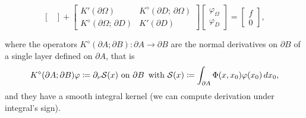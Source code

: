 \documentclass[10pt, a4paper, twoside, openright]{book}
\theoremstyle{definition}
\theoremstyle{plain}
\theoremstyle{plain}
\theoremstyle{plain}
\theoremstyle{plain}
\theoremstyle{plain}
\theoremstyle{plain}
\theoremstyle{plain}
\theoremstyle{plain}
\let\phi\varphi
\begin{document}
\begin{enumerate}
\begin{equation}
\begin{bmatrix}
 \end{bmatrix}
 + 
 \begin{bmatrix}
 K'(\partial \Omega) & K^\diamond(\partial D;\,\partial \Omega)\\
 K^\diamond(\partial \Omega;\,\partial D) & K'(\partial D)
 \end{bmatrix}
 \begin{bmatrix}
  \phi_\Omega\\ \phi_D
 \end{bmatrix}
 =
 \begin{bmatrix}
 f\\ 0
 \end{bmatrix}
 ,
 \end{equation}
\end{enumerate}
where the operators $K^\diamond(\partial A;\partial B):\partial A\to\partial B$ are the normal derivatives 
on $\partial B$ of a single layer defined on $\partial A$, that is
\begin{equation}
 K^\diamond(\partial A;\partial B)\phi\coloneqq \partial_\nu \mathcal{S}(x)\textup{ on }\partial B\,\textup{ with }
 \mathcal{S}(x)\coloneqq \int_{\partial A}\Phi(x,x_0)\phi(x_0)\,dx_0,
\end{equation}
and they have a smooth integral kernel (we can compute derivation under integral's sign).
\end{document}
